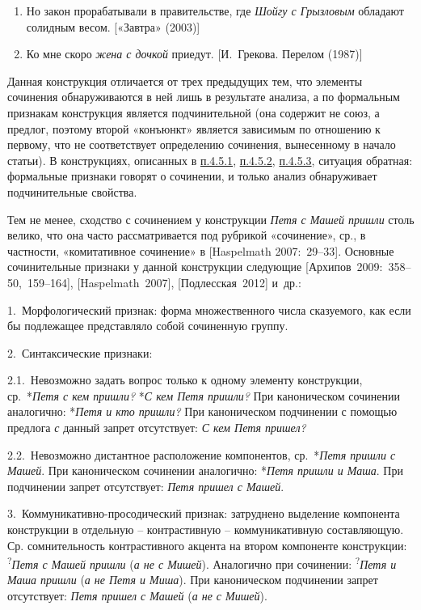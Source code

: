 \begin{enumerate}
\def\labelenumi{(\arabic{enumi})}
\setcounter{enumi}{62}
\item
  Но закон прорабатывали в правительстве, где \emph{Шойгу с Грызловым}
  обладают солидным весом. {[}«Завтра» (2003){]}
\item
  Ко мне скоро \emph{жена с дочкой} приедут. {[}И.~Грекова. Перелом
  (1987){]}
\end{enumerate}

Данная конструкция отличается от трех предыдущих тем, что элементы
сочинения обнаруживаются в ней лишь в результате анализа, а по
формальным признакам конструкция является подчинительной (она содержит
не союз, а предлог, поэтому второй «конъюнкт» является зависимым по
отношению к первому, что не соответствует определению сочинения,
вынесенному в начало статьи). В конструкциях, описанных в
\underline{п.4.5.1}, \underline{п.4.5.2}, \underline{п.4.5.3}, ситуация
обратная: формальные признаки говорят о сочинении, и только анализ
обнаруживает подчинительные свойства.

Тем не менее, сходство с сочинением у конструкции \emph{Петя с Машей
пришли} столь велико, что она часто рассматривается под рубрикой
«сочинение», ср., в частности, «комитативное сочинение» в {[}Haspelmath
2007:~29--33{]}. Основные сочинительные признаки у данной конструкции
следующие {[}Архипов~2009:~358--50,~159--164{]}, {[}Haspelmath~2007{]},
{[}Подлесская~2012{]} и~др.:

1.~Морфологический признак: форма множественного числа сказуемого, как
если бы подлежащее представляло собой сочиненную группу.

2.~Синтаксические признаки:

2.1.~Невозможно задать вопрос только к одному элементу конструкции,
ср.~*\emph{Петя с кем пришли?} *\emph{С кем Петя пришли?} При
каноническом сочинении аналогично: *\emph{Петя и кто пришли?} При
каноническом подчинении с помощью предлога \emph{с} данный запрет
отсутствует: \emph{С кем Петя пришел?}

2.2.~Невозможно дистантное расположение компонентов, ср.~*\emph{Петя
пришли с Машей}. При каноническом сочинении аналогично: *\emph{Петя
пришли и Маша}. При подчинении запрет отсутствует: \emph{Петя пришел с
Машей}.

3.~Коммуникативно-просодический признак: затруднено выделение компонента
конструкции в отдельную -- контрастивную -- коммуникативную
составляющую. Ср. сомнительность контрастивного акцента на втором
компоненте конструкции: \textsuperscript{?}\emph{Петя с Машей пришли}
(\emph{а не с Мишей}). Аналогично при сочинении:
\textsuperscript{?}\emph{Петя и Маша пришли} (\emph{а не Петя и Миша}).
При каноническом подчинении запрет отсутствует: \emph{Петя пришел с
Машей} (\emph{а не с Мишей}).

